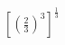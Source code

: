 \documentclass[preview]{standalone}
\begin{document}
\begin{align*}
\left[ \left( \frac{2}{3} \right)^{3} \right]^{\frac{1}{3}}
\end{align*}
\end{document}
